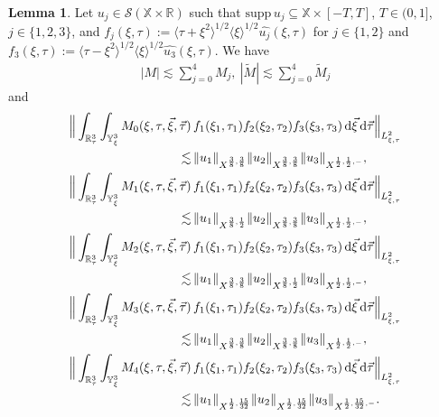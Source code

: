 \documentclass[reqno]{amsart}
\theoremstyle{Definitionl}
\theoremstyle{Definitionk}
\theoremstyle{definition}
\theoremstyle{Satzk}
\newtheorem{lemmak}[defi]{Lemma}
\theoremstyle{Satzl}
\theoremstyle{Bemerkung}
\begin{document}
\begin{lemmak}
Let $u_j\in\mathcal S(\mathbb X\times\mathbb R)$ such that $\mathrm{supp}\,u_j\subseteq\mathbb X\times[-T,T]$, $T\in(0,1]$, $j\in\{1,2,3\}$, and $f_j(\xi,\tau):=\langle\tau+\xi^2\rangle^{1/2}\langle\xi\rangle^{1/2}\widehat{u_j}(\xi,\tau)$ for $j\in\{1,2\}$ and $f_3(\xi,\tau):=\langle\tau-\xi^2\rangle^{1/2}\langle\xi\rangle^{1/2}\widehat{u_3}(\xi,\tau)$. We have
\begin{align}
|M|\lesssim \sum_{j=0}^4M_j,\ 
|\tilde M|\lesssim \sum_{j=0}^4\tilde{M}_j\label{tm}
\end{align}
and
\begin{align}
\Big\|\int_{\mathbb R^3_\tau}\int_{\mathbb Y^3_\xi}M_0(\xi,\tau,\vec\xi,\vec\tau)&\,f_{1}(\xi_1,\tau_1)f_{2}(\xi_2,\tau_2)f_{3}(\xi_3,\tau_3)\,\mathrm d\vec\xi\,\mathrm d\vec\tau\Big\|_{L^2_{\xi,\tau}}\nonumber\\
\lesssim&\, \|u_1\|_{X^{\frac38,\frac38}}\|u_2\|_{X^{\frac38,\frac38}}\|u_3\|_{X^{\frac12,\frac12,-}}\label{M0},\\
\Big\|\int_{\mathbb R^3_\tau}\int_{\mathbb Y^3_\xi}M_1(\xi,\tau,\vec\xi,\vec\tau)&\,f_{1}(\xi_1,\tau_1)f_{2}(\xi_2,\tau_2)f_{3}(\xi_3,\tau_3)\,\mathrm d\vec\xi\,\mathrm d\vec\tau\Big\|_{L^2_{\xi,\tau}}\nonumber\\
\lesssim&\, \|u_1\|_{X^{\frac38,\frac12}}\|u_2\|_{X^{\frac38,\frac38}}\|u_3\|_{X^{\frac12,\frac12,-}}
\label{M1},\\
\Big\|\int_{\mathbb R^3_\tau}\int_{\mathbb Y^3_\xi}M_2(\xi,\tau,\vec\xi,\vec\tau)&\,f_{1}(\xi_1,\tau_1)f_{2}(\xi_2,\tau_2)f_{3}(\xi_3,\tau_3)\,\mathrm d\vec\xi\,\mathrm d\vec\tau\Big\|_{L^2_{\xi,\tau}}\nonumber\\
\lesssim&\, \|u_1\|_{X^{\frac38,\frac38}}\|u_2\|_{X^{\frac38,\frac12}}\|u_3\|_{X^{\frac12,\frac12,-}}
\label{M2},\\
\Big\|\int_{\mathbb R^3_\tau}\int_{\mathbb Y^3_\xi}M_3(\xi,\tau,\vec\xi,\vec\tau)&\,f_{1}(\xi_1,\tau_1)f_{2}(\xi_2,\tau_2)f_{3}(\xi_3,\tau_3)\,\mathrm d\vec\xi\,\mathrm d\vec\tau\Big\|_{L^2_{\xi,\tau}}\nonumber\\
\lesssim&\, \|u_1\|_{X^{\frac38,\frac38}}\|u_2\|_{X^{\frac38,\frac38}}\|u_3\|_{X^{\frac12,\frac12,-}}
\label{M3},\allowdisplaybreaks[1]\\
\Big\|\int_{\mathbb R^3_\tau}\int_{\mathbb Y^3_\xi}M_4(\xi,\tau,\vec\xi,\vec\tau)&\,f_{1}(\xi_1,\tau_1)f_{2}(\xi_2,\tau_2)f_{3}(\xi_3,\tau_3)\,\mathrm d\vec\xi\,\mathrm d\vec\tau\Big\|_{L^2_{\xi,\tau}}\nonumber\\
\lesssim&\, \|u_1\|_{X^{\frac12,\frac{15}{32}}}\|u_2\|_{X^{\frac12,\frac{15}{32}}}\|u_3\|_{X^{\frac12,\frac{15}{32},-}}.\label{N}\allowdisplaybreaks[1]
\end{align}
\end{lemmak}
\end{document}
